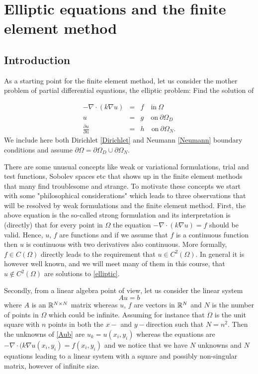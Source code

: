 \chapter{Elliptic equations and the finite element method}




\label{elliptic}
\section{Introduction}

As a starting point for the finite element method, let us
consider the mother problem of partial differential equations, 
the elliptic problem: Find the solution of 

\begin{eqnarray}
\label{elliptic}
-\nabla\cdot(k\nabla u)  &=& f \quad \textrm{in}\ \Omega\\
\label{Dirichlet}
u&=& g \quad \textrm{on}\ \partial\Omega_D \\
\label{Neumann}
\frac{\partial u}{\partial n}&=& h \quad \textrm{on}\ \partial\Omega_N . 
\end{eqnarray}
We include here both Dirichlet \eqref{Dirichlet} and Neumann \eqref{Neumann} boundary conditions
and assume $\partial \Omega = \partial \Omega_D \cup \partial \Omega_N$. 

There are some unusual concepts like weak or variational formulations, trial and test functions, Sobolev
spaces etc that shows up in the finite element methods that many find troublesome and strange. To motivate
these concepts we start with some "philosophical considerations" which leads to three observations that
will be resolved by weak formulations and the finite element method. First, the above equation is 
the so-called strong formulation and its interpretation is (directly) that for every point in $\Omega$
the equation $ -\nabla\cdot(k\nabla u)  = f$ should be valid. Hence, $u$, $f$ are functions and
if we assume that $f$ is a continuous function then $u$ is continuous with two derivatives also continuous.   
More formally, $f\in C(\Omega)$ directly leads to the requirement that $u\in C^2(\Omega)$. In general 
it is however well known, and we will meet many of them in this course, that $u \not \in C^2(\Omega)$ are
solutions to \eqref{elliptic}. 

Secondly, from a linear algebra point of view, let us consider the linear system 
\begin{equation}
\label{Aub}
A u = b 
\end{equation}
where $A$ is an $\mathbb{R}^{N\times N}$ matrix whereas $u$, $f$ are vectors in $\mathbb{R}^N$ and 
$N$ is the number of points in $\Omega$ which could be infinite. Assuming for instance
that $\Omega$ is the unit square with $n$ points in both the $x-$ and $y-$direction such 
that $N=n^2$. Then the unknowns of 
\eqref{Aub} are $u_k = u(x_i, y_i)$ whereas
the equations are     
$-\nabla\cdot (k \nabla  u(x_i, y_i) = f(x_i, y_i)$ and we notice that
we have $N$ unknowns and $N$ equations leading to a linear system with 
a square and possibly non-singular matrix, however of infinite size.  

